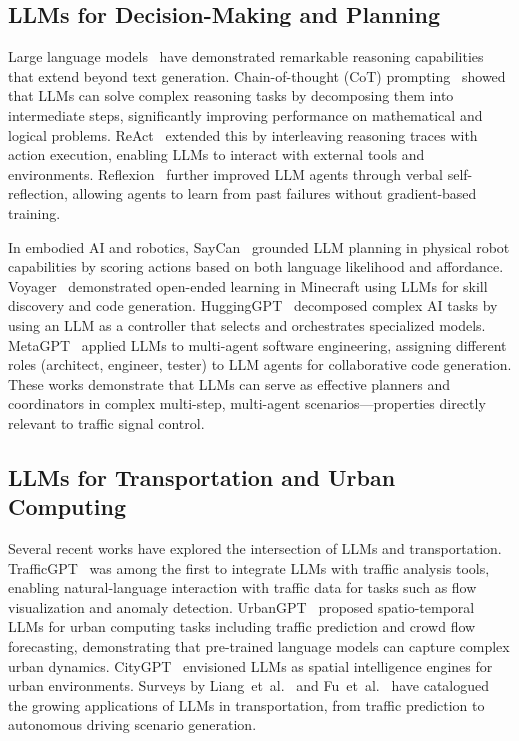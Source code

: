 \documentclass[conference]{IEEEtran}
\begin{document}
\subsection{LLMs for Decision-Making and Planning}
Large language models~\cite{brown2020gpt3, openai2023gpt4} have demonstrated remarkable reasoning capabilities that extend beyond text generation. Chain-of-thought (CoT) prompting~\cite{wei2022chainofthought} showed that LLMs can solve complex reasoning tasks by decomposing them into intermediate steps, significantly improving performance on mathematical and logical problems. ReAct~\cite{yao2022react} extended this by interleaving reasoning traces with action execution, enabling LLMs to interact with external tools and environments. Reflexion~\cite{shinn2023reflexion} further improved LLM agents through verbal self-reflection, allowing agents to learn from past failures without gradient-based training.

In embodied AI and robotics, SayCan~\cite{ahn2022} grounded LLM planning in physical robot capabilities by scoring actions based on both language likelihood and affordance. Voyager~\cite{wang2023} demonstrated open-ended learning in Minecraft using LLMs for skill discovery and code generation. HuggingGPT~\cite{shen2023hugginggpt} decomposed complex AI tasks by using an LLM as a controller that selects and orchestrates specialized models. MetaGPT~\cite{hong2023} applied LLMs to multi-agent software engineering, assigning different roles (architect, engineer, tester) to LLM agents for collaborative code generation. These works demonstrate that LLMs can serve as effective planners and coordinators in complex multi-step, multi-agent scenarios---properties directly relevant to traffic signal control.

\subsection{LLMs for Transportation and Urban Computing}
Several recent works have explored the intersection of LLMs and transportation. TrafficGPT~\cite{zhang2023trafficgpt} was among the first to integrate LLMs with traffic analysis tools, enabling natural-language interaction with traffic data for tasks such as flow visualization and anomaly detection. UrbanGPT~\cite{liu2023urbangpt} proposed spatio-temporal LLMs for urban computing tasks including traffic prediction and crowd flow forecasting, demonstrating that pre-trained language models can capture complex urban dynamics. CityGPT~\cite{wu2023citygpt} envisioned LLMs as spatial intelligence engines for urban environments. Surveys by Liang~et~al.~\cite{liang2024llmsurvey} and Fu~et~al.~\cite{fu2023llmdriving} have catalogued the growing applications of LLMs in transportation, from traffic prediction to autonomous driving scenario generation.
\end{document}
